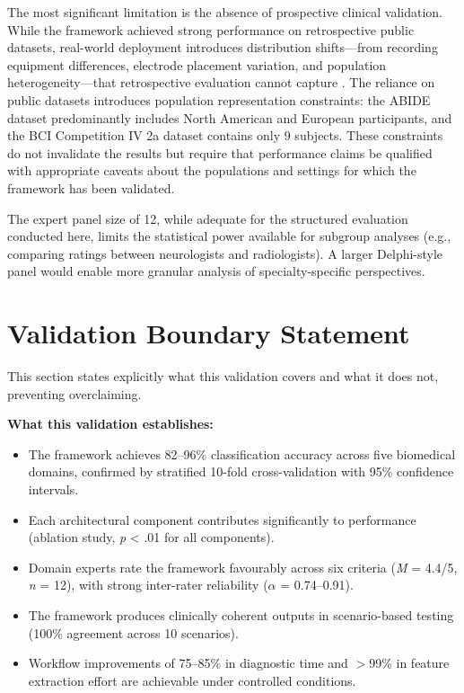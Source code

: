 The most significant limitation is the absence of prospective clinical validation. While the framework achieved strong performance on retrospective public datasets, real-world deployment introduces distribution shifts---from recording equipment differences, electrode placement variation, and population heterogeneity---that retrospective evaluation cannot capture \citep{kelly2019healthcare}. The reliance on public datasets introduces population representation constraints: the ABIDE dataset predominantly includes North American and European participants, and the BCI Competition IV 2a dataset contains only 9 subjects. These constraints do not invalidate the results but require that performance claims be qualified with appropriate caveats about the populations and settings for which the framework has been validated.

The expert panel size of 12, while adequate for the structured evaluation conducted here, limits the statistical power available for subgroup analyses (e.g., comparing ratings between neurologists and radiologists). A larger Delphi-style panel would enable more granular analysis of specialty-specific perspectives.


\section{Validation Boundary Statement}
\label{sec:val_boundary}

This section states explicitly what this validation covers and what it does not, preventing overclaiming.

\textbf{What this validation establishes:}
\begin{itemize}
    \item The framework achieves 82--96\% classification accuracy across five biomedical domains, confirmed by stratified 10-fold cross-validation with 95\% confidence intervals.
    \item Each architectural component contributes significantly to performance (ablation study, \textit{p} < .01 for all components).
    \item Domain experts rate the framework favourably across six criteria (\textit{M} = 4.4/5, \textit{n} = 12), with strong inter-rater reliability ($\alpha$ = 0.74--0.91).
    \item The framework produces clinically coherent outputs in scenario-based testing (100\% agreement across 10 scenarios).
    \item Workflow improvements of 75--85\% in diagnostic time and $>$99\% in feature extraction effort are achievable under controlled conditions.
\end{itemize}

